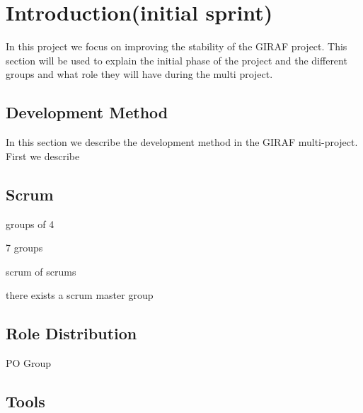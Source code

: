 \chapter{Introduction(initial sprint)}

In this project we focus on improving the stability of the GIRAF project. This
section will be used to explain the initial phase of the project and the
different groups and what role they will have during the multi project.


\section{Development Method}
In this section we describe the development method in the GIRAF multi-project.
First we describe 




\section{Scrum}

groups of 4

7 groups

scrum of scrums

there exists a scrum master group

\section{Role Distribution}

PO Group



\section{Tools}